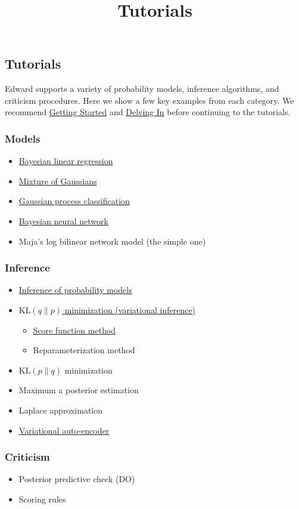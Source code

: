 \title{Tutorials}

\subsection{Tutorials}

Edward supports a variety of probability models, inference
algorithms, and criticism procedures. Here we show a few key examples from each
category. We recommend \href{getting-started.html}{Getting Started} and 
\href{delving-in.html}{Delving In} before continuing to the tutorials.

\subsubsection{Models}

\begin{itemize}
\item \href{tut_bayesian_linear_regression.html}{Bayesian linear regression}
\item \href{tut_mixture_gaussian.html}{Mixture of Gaussians}
\item \href{tut_gp_classification.html}{Gaussian process classification}
\item \href{tut_bayesian_nn.html}{Bayesian neural network}
\item Maja's log bilinear network model (the simple one)
\end{itemize}

\subsubsection{Inference}

\begin{itemize}
  \item \href{tut_inference_probability_models.html}{Inference of probability
  models}
  \item \href{tut_KLqp.html}{$\text{KL}(q\|p)$ minimization (variational
  inference)}
  \begin{itemize}
    \item \href{tut_KLqp_score.html}{Score function method}
    \item Reparameterization method
  \end{itemize}
  \item $\text{KL}(p\|q)$ minimization
  \item Maximum a posterior estimation 
  \item Laplace approximation 
  \item
  \href{https://github.com/blei-lab/edward/blob/master/examples/convolutional_vae.py}{Variational
  auto-encoder}
\end{itemize}

\subsubsection{Criticism}

\begin{itemize}
  \item Posterior predictive check (DO)
  \item Scoring rules
\end{itemize}
